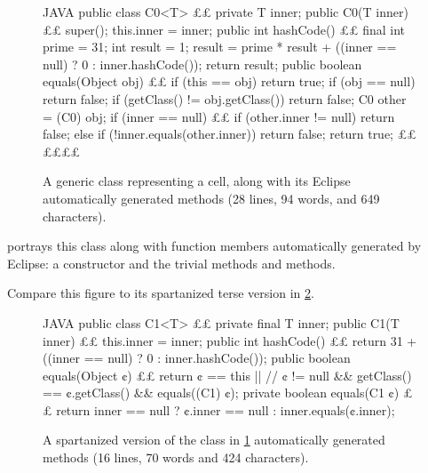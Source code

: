 \begin{figure}[H]
  \caption{A generic class representing a cell, along with its Eclipse
  automatically generated methods (28 lines, 94 words, and 649 characters).}
    \label{figure:cell0}
    \begin{adjustbox}{max width=\columnwidth}
\begin{code}[minipage, width=1.25\columnwidth]{JAVA}
public class C0<T> {££
  private T inner;
  public C0(T inner) {££
    super();
    this.inner = inner;
  }
  public int hashCode() {££
    final int prime = 31;
    int result = 1;
    result = prime * result + ((inner == null) ? 0 : inner.hashCode());
    return result;
  }
  public boolean equals(Object obj) {££
    if (this == obj)
      return true;
    if (obj == null)
      return false;
    if (getClass() != obj.getClass())
      return false;
    C0 other = (C0) obj;
    if (inner == null) {££
      if (other.inner != null)
        return false;
    } else if (!inner.equals(other.inner))
      return false;
    return true;
  }££
}££££
\end{code}
\end{adjustbox}
\end{figure}

 portrays this class along with function members
automatically generated by Eclipse: a constructor and the trivial methods
 and  methods.

Compare this figure to its spartanized terse version in \cref{figure:cell1}.

\begin{figure}[H]
  \caption{A spartanized version of the \Java class in \cref{figure:cell0}
    automatically generated methods (16 lines, 70 words and 424 characters).}
    \label{figure:cell1}
    \begin{adjustbox}{max width=\columnwidth}
\begin{code}[minipage, width=1.25\columnwidth]{JAVA}
public class C1<T> {££
  private final T inner;
  public C1(T inner) {££
    this.inner = inner;
  }
  public int hashCode() {££
    return 31 + ((inner == null) ? 0 : inner.hashCode());
  }
  public boolean equals(Object ¢) {££
    return ¢ == this || //
      ¢ != null && getClass() == ¢.getClass() && equals((C1) ¢);
  }
  private boolean equals(C1 ¢) {££
    return inner == null ? ¢.inner == null : inner.equals(¢.inner);
  }
}
\end{code}
\end{adjustbox}
\end{figure}

